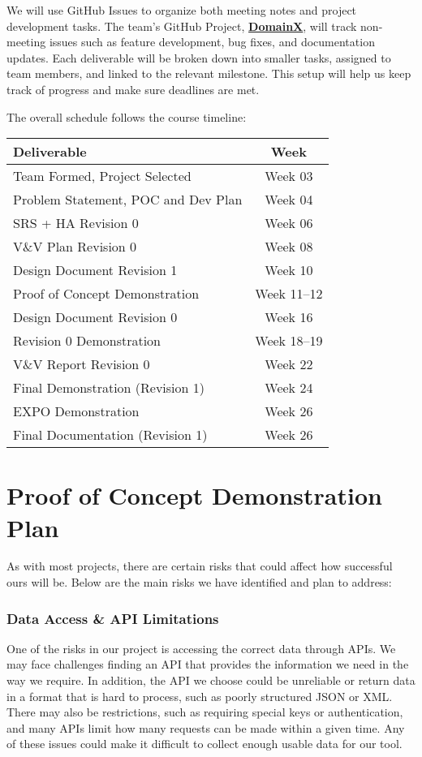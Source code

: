 \documentclass{article}
\begin{document}
We will use GitHub Issues to organize both meeting notes and project development tasks.
The team’s GitHub Project, \href{https://github.com/users/thaafei/projects/6}{\textbf{DomainX}}, will track non-meeting issues such as feature development, bug fixes, and documentation updates.
Each deliverable will be broken down into smaller tasks, assigned to team members, and linked to the relevant milestone.
This setup will help us keep track of progress and make sure deadlines are met.

The overall schedule follows the course timeline:

\begin{center}
\begin{tabular}{|l|c|}
\hline
\textbf{Deliverable} & \textbf{Week} \\
\hline
Team Formed, Project Selected & Week 03 \\
Problem Statement, POC and Dev Plan & Week 04 \\
SRS + HA Revision 0 & Week 06 \\
V\&V Plan Revision 0 & Week 08 \\
Design Document Revision 1 & Week 10 \\
Proof of Concept Demonstration & Week 11--12 \\
Design Document Revision 0 & Week 16 \\
Revision 0 Demonstration & Week 18--19 \\
V\&V Report Revision 0 & Week 22 \\
Final Demonstration (Revision 1) & Week 24 \\
EXPO Demonstration & Week 26 \\
Final Documentation (Revision 1) & Week 26 \\
\hline
\end{tabular}
\end{center}


\section{Proof of Concept Demonstration Plan}

As with most projects, there are certain risks that could affect how successful ours will be. Below are the main risks we have identified and plan to address:

\subsubsection*{Data Access \& API Limitations}\vspace{-0.5em}
One of the risks in our project is accessing the correct data through APIs. We may face challenges finding an API that provides the information we need in the way we require. In addition, the API we choose could be unreliable or return data in a format that is hard to process, such as poorly structured JSON or XML. There may also be restrictions, such as requiring special keys or authentication, and many APIs limit how many requests can be made within a given time. Any of these issues could make it difficult to collect enough usable data for our tool.
\end{document}

